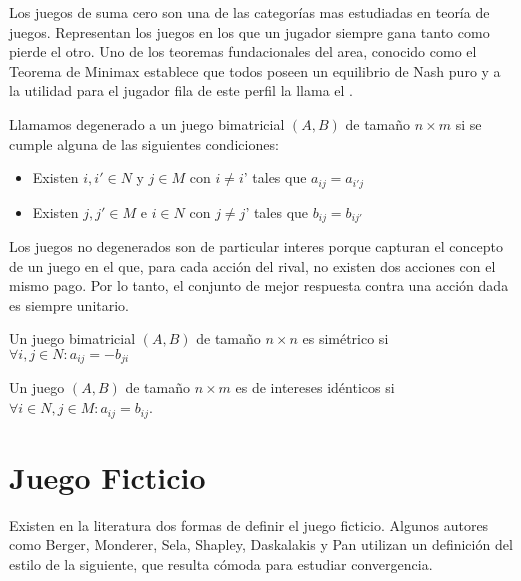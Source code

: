Los juegos de suma cero son una de las categorías mas estudiadas en teoría de juegos. Representan los juegos en los que un jugador siempre gana tanto como pierde el otro. Uno de los teoremas fundacionales del area, conocido como el Teorema de Minimax \cite{nash:minmax} establece que todos poseen un equilibrio de Nash puro y a la utilidad para el jugador fila de este perfil la llama el .

\begin{definition}
    Llamamos degenerado a un juego bimatricial $(A, B)$ de tamaño $n \times m$ si se cumple alguna de las siguientes condiciones:
    \begin{itemize}
        \item Existen $i, i' \in N$ y $j \in M$ con $i \neq i$' tales que $a_{ij} = a_{i'j}$
        \item Existen $j, j' \in M$ e $i \in N$ con $j \neq j$' tales que $b_{ij} = b_{ij'}$
    \end{itemize}
\end{definition}
Los juegos no degenerados son de particular interes porque capturan el concepto de un juego en el que, para cada acción del rival, no existen dos acciones con el mismo pago. Por lo tanto, el conjunto de mejor respuesta contra una acción dada es siempre unitario.

\begin{definition}
    Un juego bimatricial $(A, B)$ de tamaño $n \times n$ es simétrico si $\forall i, j \in N : a_{ij} = -b_{ji}$
\end{definition}

\begin{definition}
    Un juego $(A, B)$ de tamaño $n \times m$ es de intereses idénticos si $\forall i \in N, j \in M : a_{ij} = b_{ij}$.
\end{definition}

\section{Juego Ficticio} \label{sec:def:fp}

Existen en la literatura dos formas de definir el juego ficticio. Algunos autores como Berger, Monderer, Sela, Shapley, Daskalakis y Pan \cite{browns:original} \cite{no:cycling} \cite{2x2:without} \cite{identical:interests} \cite{counter:karlin:strong} utilizan un definición del estilo de la siguiente, que resulta cómoda para estudiar convergencia.

